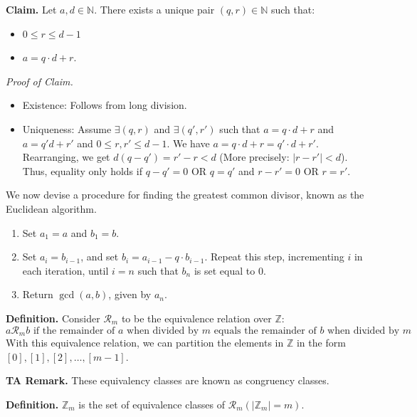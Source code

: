 \documentclass{article}
\begin{document}
    \vspace{1.5mm}
    \textbf{Claim.} Let $a, d \in \mathbb{N}$. There exists a unique pair $(q, r) \in \mathbb{N}$ such that: 
    \begin{itemize}
        \item $0 \le r \le d - 1$
        \item $a = q \cdot d + r$.
    \end{itemize}
    
    \vspace{1.5mm}
    \textit{Proof of Claim. }
    \begin{itemize}
        \item Existence: Follows from long division.
        \item Uniqueness: Assume $\exists(q, r)$ and $\exists(q', r')$ such that $a = q \cdot d + r$ and $a = q'd + r'$ and $0 \le r, r' \le d - 1$. We have $a = q \cdot d + r = q' \cdot d + r'$. Rearranging, we get $d(q - q') = r' - r < d$ (More precisely: $|r - r'| < d$). Thus, equality only holds if $q - q' = 0$ OR $q = q'$ and $r - r' = 0$ OR $r = r'$.
    \end{itemize}
    We now devise a procedure for finding the greatest common divisor, known as the Euclidean algorithm.
    \begin{enumerate}[leftmargin=1.2in]
        \item [\textbf{Initialization.}] Set $a_{1} = a$ and $b_{1} = b$.
        \item [\textbf{Inductive Step.}] Set $a_{i} = b_{i - 1}$, and set $b_{i} = a_{i - 1} - q \cdot b_{i - 1}$. Repeat this step, incrementing $i$ in each iteration, until $i = n$ such that $b_{n}$ is set equal to $0$.
        \item [\textbf{Termination.}] Return $\gcd(a, b)$, given by $a_{n}$.
    \end{enumerate}
    
    \textbf{Definition.} Consider $\mathcal{R}_{m}$ to be the equivalence relation over $\mathbb{Z}$: $$\text{$a \mathcal{R}_{m} b$ if the remainder of $a$ when divided by $m$ equals the remainder of $b$ when divided by $m$}.$$ With this equivalence relation, we can partition the elements in $\mathbb{Z}$ in the form $[0], [1], [2],\dots, [m-1]$.
    
    \vspace{1.5mm}
    \textbf{TA Remark. } These equivalency classes are known as congruency classes.
    
    \vspace{1.5mm}
    \textbf{Definition. } $\mathbb{Z}_{m}$ is the set of equivalence classes of $\mathcal{R}_{m} (|\mathbb{Z}_{m}| = m)$.
    
\end{document}

